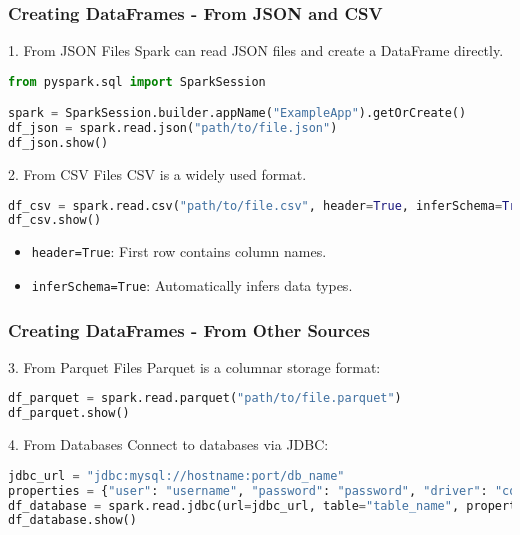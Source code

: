 \documentclass[aspectratio=169]{beamer}
\begin{document}
\begin{frame}[fragile]
    \frametitle{Creating DataFrames - From JSON and CSV}
    \begin{block}{1. From JSON Files}
        Spark can read JSON files and create a DataFrame directly.
        \begin{lstlisting}[language=python]
from pyspark.sql import SparkSession

spark = SparkSession.builder.appName("ExampleApp").getOrCreate()
df_json = spark.read.json("path/to/file.json")
df_json.show()
        \end{lstlisting}
    \end{block}

    \begin{block}{2. From CSV Files}
        CSV is a widely used format. 
        \begin{lstlisting}[language=python]
df_csv = spark.read.csv("path/to/file.csv", header=True, inferSchema=True)
df_csv.show()
        \end{lstlisting}
        \begin{itemize}
            \item \texttt{header=True}: First row contains column names.
            \item \texttt{inferSchema=True}: Automatically infers data types.
        \end{itemize}
    \end{block}
\end{frame}

\begin{frame}[fragile]
    \frametitle{Creating DataFrames - From Other Sources}
    \begin{block}{3. From Parquet Files}
        Parquet is a columnar storage format:
        \begin{lstlisting}[language=python]
df_parquet = spark.read.parquet("path/to/file.parquet")
df_parquet.show()
        \end{lstlisting}
    \end{block}

    \begin{block}{4. From Databases}
        Connect to databases via JDBC:
        \begin{lstlisting}[language=python]
jdbc_url = "jdbc:mysql://hostname:port/db_name"
properties = {"user": "username", "password": "password", "driver": "com.mysql.jdbc.Driver"}
df_database = spark.read.jdbc(url=jdbc_url, table="table_name", properties=properties)
df_database.show()
        \end{lstlisting}
    \end{block}
\end{frame}
\end{document}

